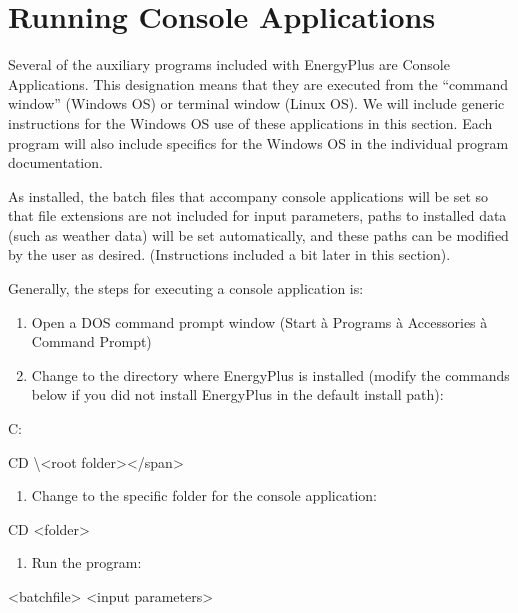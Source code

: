 \chapter{Running Console Applications}\label{running-console-applications}

Several of the auxiliary programs included with EnergyPlus are Console Applications. This designation means that they are executed from the ``command window'' (Windows OS) or terminal window (Linux OS). We will include generic instructions for the Windows OS use of these applications in this section. Each program will also include specifics for the Windows OS in the individual program documentation.

As installed, the batch files that accompany console applications will be set so that file extensions are not included for input parameters, paths to installed data (such as weather data) will be set automatically, and these paths can be modified by the user as desired. (Instructions included a bit later in this section).

Generally, the steps for executing a console application is:

\begin{enumerate}
\def\labelenumi{\arabic{enumi})}
\item
  Open a DOS command prompt window (Start à Programs à Accessories à Command Prompt)
\item
  Change to the directory where EnergyPlus is installed (modify the commands below if you did not install EnergyPlus in the default install path):
\end{enumerate}

C:

CD \textbackslash{}\textless{}root folder\textgreater{}\textless{}/span\textgreater{}

\begin{enumerate}
\def\labelenumi{\arabic{enumi})}
\setcounter{enumi}{2}
\tightlist
\item
  Change to the specific folder for the console application:
\end{enumerate}

CD \textless{}folder\textgreater{}

\begin{enumerate}
\def\labelenumi{\arabic{enumi})}
\setcounter{enumi}{3}
\tightlist
\item
  Run the program:
\end{enumerate}

\textless{}batchfile\textgreater{} \textless{}input parameters\textgreater{}
